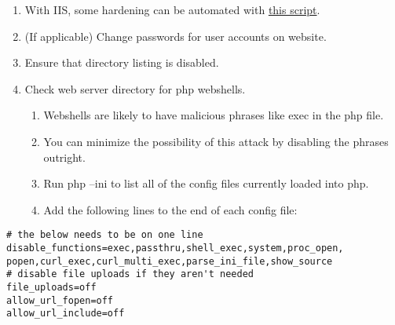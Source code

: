 \documentclass[12pt,letterpaper]{article}
\begin{document}
\begin{enumerate}
	\item With IIS, some hardening can be automated with \href{https://github.com/ufsitblue/blue/blob/main/dsu_blue/windows/IIS.ps1}{this script}.
	\item (If applicable) Change passwords for user accounts on website.
	\item Ensure that directory listing is disabled.
	\item Check web server directory for php webshells.
	\begin{enumerate}
		\item Webshells are likely to have malicious phrases like exec in the php file.
		\item You can minimize the possibility of this attack by disabling the phrases outright.
		\item Run php --ini to list all of the config files currently loaded into php.
		\item Add the following lines to the end of each config file:
	\end{enumerate}
\end{enumerate}

\begin{verbatim}
# the below needs to be on one line
disable_functions=exec,passthru,shell_exec,system,proc_open,
popen,curl_exec,curl_multi_exec,parse_ini_file,show_source
# disable file uploads if they aren't needed
file_uploads=off
allow_url_fopen=off
allow_url_include=off
\end{verbatim}
\end{document}
